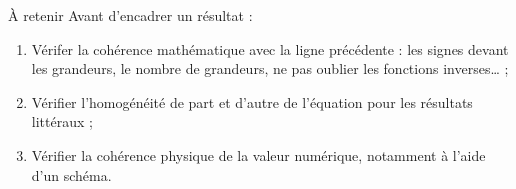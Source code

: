 \documentclass[a4paper, 12pt, final, garamond]{book}
\begin{document}
\begin{ror}[label=impo:règles, hand]{À retenir}
    Avant d'encadrer un résultat :
    \begin{enumerate}
        \item Vérifer la cohérence mathématique avec la ligne précédente : les
            signes devant les grandeurs, le nombre de grandeurs, ne pas oublier
            les fonctions inverses… ;
        \item Vérifier l'homogénéité de part et d'autre de l'équation pour les
            résultats littéraux ;
        \item Vérifier la cohérence physique de la valeur numérique, notamment à
            l'aide d'un schéma.
    \end{enumerate}
\end{ror}
\end{document}
